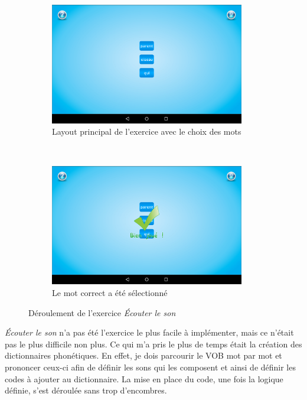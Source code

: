 \begin{figure}[H]
\begin{subfigure}[t]{8.5cm}
\includegraphics[width=8.5cm]{img/son-start.png}
\caption{Layout principal de l'exercice avec le choix des mots}
\label{son1}
\end{subfigure}
~
\begin{subfigure}[t]{8.5cm}
\includegraphics[width=8.5cm]{img/son-ok.png}
\caption{Le mot correct a été sélectionné}
\label{son2}
\end{subfigure}
\caption{Déroulement de l'exercice \textit{Écouter le son}}
\end{figure}

\textit{Écouter le son} n'a pas été l'exercice le plus facile à implémenter, mais ce n'était pas le plus difficile non plus. Ce qui m'a pris le plus de temps était la création des dictionnaires phonétiques. En effet, je dois parcourir le VOB mot par mot et prononcer ceux-ci afin de définir les sons qui les composent et ainsi de définir les codes à ajouter au dictionnaire. La mise en place du code, une fois la logique définie, s'est déroulée sans trop d'encombres.

